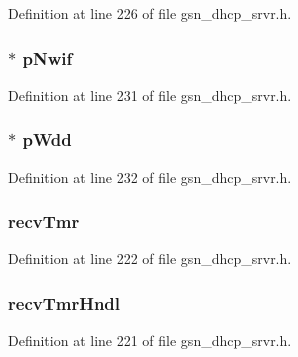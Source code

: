 Definition at line 226 of file gsn\_\-dhcp\_\-srvr.h.

\hypertarget{a00043_a98d510676ecd134a5e9ac61bf222cded}{
\subsubsection[{pNwif}]{$\ast$ {\bf pNwif}}}
\label{a00043_a98d510676ecd134a5e9ac61bf222cded}


Definition at line 231 of file gsn\_\-dhcp\_\-srvr.h.

\hypertarget{a00043_a97684b58b7a05f9b282a86a26929e1ba}{
\subsubsection[{pWdd}]{$\ast$ {\bf pWdd}}}
\label{a00043_a97684b58b7a05f9b282a86a26929e1ba}


Definition at line 232 of file gsn\_\-dhcp\_\-srvr.h.

\hypertarget{a00043_aceccc0d31027efd5c8c774981cb782f3}{
\subsubsection[{recvTmr}]{ {\bf recvTmr}}}
\label{a00043_aceccc0d31027efd5c8c774981cb782f3}


Definition at line 222 of file gsn\_\-dhcp\_\-srvr.h.

\hypertarget{a00043_a99352b33eae768a9ac49ad9cd195a03f}{
\subsubsection[{recvTmrHndl}]{ {\bf recvTmrHndl}}}
\label{a00043_a99352b33eae768a9ac49ad9cd195a03f}


Definition at line 221 of file gsn\_\-dhcp\_\-srvr.h.


